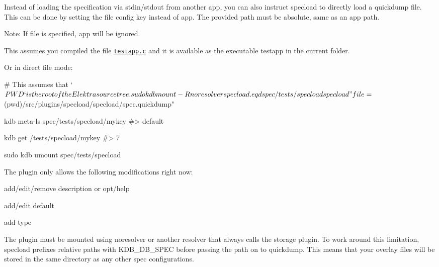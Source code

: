 Instead of loading the specification via {\ttfamily stdin}/{\ttfamily stdout} from another app, you can also instruct {\ttfamily specload} to directly load a {\ttfamily quickdump} file. This can be done by setting the {\ttfamily file} config key instead of {\ttfamily app}. The provided path must be absolute, same as an {\ttfamily app} path.

Note\+: If {\ttfamily file} is specified, {\ttfamily app} will be ignored.

This assumes you compiled the file \href{/home/jenkins/workspace/libelektra-release/src/plugins/specload/testapp.c}{\tt {\ttfamily testapp.\+c}} and it is available as the executable {\ttfamily testapp} in the current folder.




Or in direct file mode\+:


\begin{DoxyCode}
# This assumes that `$PWD` is the root of the Elektra source tree.
sudo kdb mount -R noresolver specload.eqd spec/tests/specload specload
       "file=$(pwd)/src/plugins/specload/specload/spec.quickdump"

kdb meta-ls spec/tests/specload/mykey
#> default

kdb get /tests/specload/mykey
#> 7

sudo kdb umount spec/tests/specload
\end{DoxyCode}



\begin{DoxyItemize}
\item The plugin only allows the following modifications right now\+:
\begin{DoxyItemize}
\item add/edit/remove {\ttfamily description} or {\ttfamily opt/help}
\item add/edit {\ttfamily default}
\item add {\ttfamily type}
\end{DoxyItemize}
\item The plugin must be mounted using {\ttfamily noresolver} or another resolver that always calls the storage plugin. To work around this limitation, {\ttfamily specload} prefixes relative paths with {\ttfamily K\+D\+B\+\_\+\+D\+B\+\_\+\+S\+P\+EC} before passing the path on to {\ttfamily quickdump}. This means that your overlay files will be stored in the same directory as any other {\ttfamily spec} configurations. 
\end{DoxyItemize}